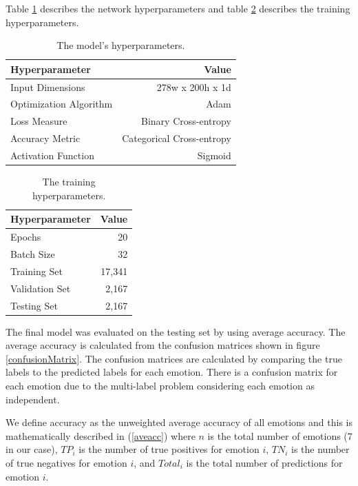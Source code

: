 \documentclass[conference]{IEEEtran}
\begin{document}
Table \ref{modelHyperparams} describes the network hyperparameters and table \ref{trainHyperparams} describes the training hyperparameters.

\bgroup
\def\arraystretch{2}
\begin{table}[h!]
	\centering
	\caption{The model's hyperparameters.}
	\label{modelHyperparams}
	{%
		\begin{tabular}{|l|r|}
			\hline
			\textbf{Hyperparameter} & \textbf{Value} \\ \hline
			\rowcolor[HTML]{F6F8FA} 
			Input Dimensions & 278w x 200h x 1d \\ \hline
			Optimization Algorithm & Adam \\ \hline
			\rowcolor[HTML]{F6F8FA} 
			Loss Measure & Binary Cross-entropy \\ \hline
			Accuracy Metric & Categorical Cross-entropy \\ \hline
			\rowcolor[HTML]{F6F8FA} 
			Activation Function & Sigmoid \\ \hline
		\end{tabular}%
	}
\end{table}
\egroup

\bgroup
\def\arraystretch{2}
\begin{table}[h!]
	\centering
	\caption{The training hyperparameters.}
	\label{trainHyperparams}
	{%
		\begin{tabular}{|l|r|}
			\hline
			\textbf{Hyperparameter} & \textbf{Value} \\ \hline
			\rowcolor[HTML]{F6F8FA} 
			Epochs & 20 \\ \hline
			Batch Size & 32 \\ \hline
			\rowcolor[HTML]{F6F8FA} 
			Training Set & 17,341 \\ \hline
			Validation Set & 2,167 \\ \hline
			\rowcolor[HTML]{F6F8FA} 
			Testing Set & 2,167 \\ \hline
		\end{tabular}%
	}
\end{table}
\egroup

The final model was evaluated on the testing set by using average accuracy. The average accuracy is calculated from the confusion matrices shown in figure \ref{confusionMatrix}. The confusion matrices are calculated by comparing the true labels to the predicted labels for each emotion. There is a confusion matrix for each emotion due to the multi-label problem considering each emotion as independent.

We define accuracy as the unweighted average accuracy of all emotions and this is mathematically described in (\ref{aveacc}) where $n$ is the total number of emotions (7 in our case), $TP_{i}$ is the number of true positives for emotion $i$, $TN_{i}$ is the number of true negatives for emotion $i$, and $Total_{i}$ is the total number of predictions for emotion $i$.
\end{document}
